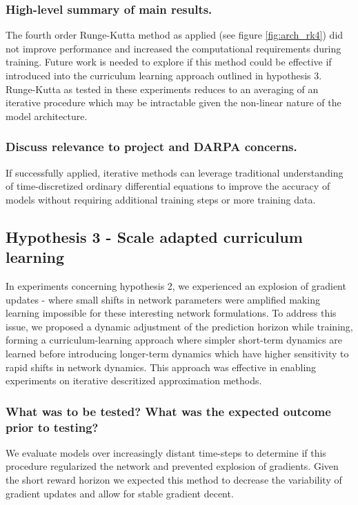 \documentclass[12pt]{article}
\theoremstyle{plain}
\theoremstyle{remark}
\theoremstyle{definition}
\begin{document}
\subsubsection{High-level summary of main results.}
	The fourth order Runge-Kutta method as applied (see figure \ref{fig:arch_rk4}) did not improve performance and increased the computational requirements during training. Future work is needed to explore if this method could be effective if introduced into the curriculum learning approach outlined in hypothesis 3. Runge-Kutta as tested in these experiments reduces to an averaging of an iterative procedure which may be intractable given the non-linear nature of the model architecture.


\subsubsection{Discuss relevance to project and DARPA concerns.}
	If successfully applied, iterative methods can leverage traditional understanding of time-discretized ordinary differential equations to improve the accuracy of models without requiring additional training steps or more training data.


\subsection{Hypothesis 3 - Scale adapted curriculum learning}

In experiments concerning hypothesis 2, we experienced an explosion of gradient updates - where small shifts in network parameters were amplified making learning impossible for these interesting network formulations. To address this issue, we proposed a dynamic adjustment of the prediction horizon while training, forming a curriculum-learning approach where simpler short-term dynamics are learned before introducing longer-term dynamics which have higher sensitivity to rapid shifts in network dynamics. This approach was effective in enabling experiments on iterative descritized approximation methods.


\subsubsection{What was to be tested? What was the expected outcome prior to testing?}
	We evaluate models over increasingly distant time-steps to determine if this procedure regularized the network and prevented explosion of gradients. Given the short reward horizon we expected this method to decrease the variability of gradient updates and allow for stable gradient decent.
\end{document}
